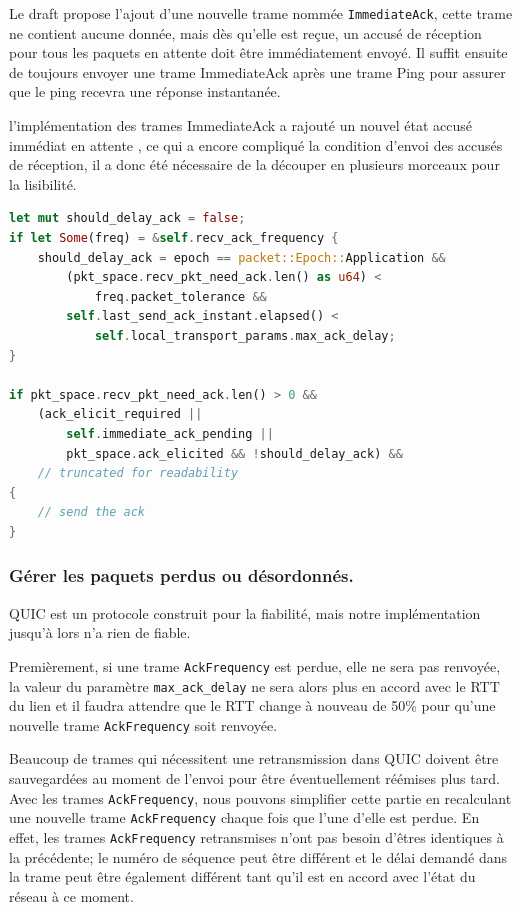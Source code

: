 Le draft propose l'ajout d'une nouvelle trame nommée \texttt{ImmediateAck}, cette trame ne contient aucune donnée, mais dès qu'elle est reçue, un accusé de réception pour tous les paquets en attente doit être immédiatement envoyé. Il suffit ensuite de toujours envoyer une trame ImmediateAck après une trame Ping pour assurer que le ping recevra une réponse instantanée.

\vspace{0.5cm}

l'implémentation des trames ImmediateAck a rajouté un nouvel état \guillemotleft accusé immédiat en attente \guillemotright, ce qui a encore compliqué la condition d'envoi des accusés de réception, il a donc été nécessaire de la découper en plusieurs morceaux pour la lisibilité.

\begin{center}
    \begin{lstlisting}[language=Rust, caption={Version finale de la condition d'envoi d'accusé de réception.}]
let mut should_delay_ack = false;
if let Some(freq) = &self.recv_ack_frequency {
    should_delay_ack = epoch == packet::Epoch::Application &&
        (pkt_space.recv_pkt_need_ack.len() as u64) <
            freq.packet_tolerance &&
        self.last_send_ack_instant.elapsed() <
            self.local_transport_params.max_ack_delay;
}

if pkt_space.recv_pkt_need_ack.len() > 0 &&
    (ack_elicit_required ||
        self.immediate_ack_pending ||
        pkt_space.ack_elicited && !should_delay_ack) &&
    // truncated for readability
{
    // send the ack
}
    \end{lstlisting}
\end{center}

\subsubsection{Gérer les paquets perdus ou désordonnés.}

QUIC est un protocole construit pour la fiabilité, mais notre implémentation jusqu'à lors n'a rien de fiable.

Premièrement, si une trame \texttt{AckFrequency} est perdue, elle ne sera pas renvoyée, la valeur du paramètre \verb|max_ack_delay| ne sera alors plus en accord avec le RTT du lien et il faudra attendre que le RTT change à nouveau de 50\% pour qu'une nouvelle trame \texttt{AckFrequency} soit renvoyée.

Beaucoup de trames qui nécessitent une retransmission dans QUIC doivent être sauvegardées au moment de l'envoi pour être éventuellement réémises plus tard.
Avec les trames \texttt{AckFrequency}, nous pouvons simplifier cette partie en recalculant une nouvelle trame \texttt{AckFrequency} chaque fois que l'une d'elle est perdue. En effet, les trames \texttt{AckFrequency} retransmises n'ont pas besoin d'êtres identiques à la précédente; le numéro de séquence peut être différent et le délai demandé dans la trame peut être également différent tant qu'il est en accord avec l'état du réseau à ce moment.

